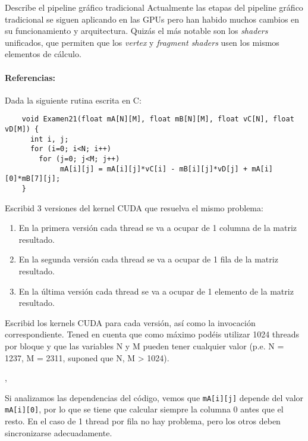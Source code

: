 \begin{pregunta}{Describe el pipeline gráfico tradicional}
Actualmente las etapas del pipeline gráfico tradicional se siguen aplicando en
las GPUs pero han habido muchos cambios en su funcionamiento y arquitectura.
Quizás el más notable son los \emph{shaders} unificados, que permiten que
los \emph{vertex} y \emph{fragment shaders} usen los mismos elementos de
cálculo.

\paragraph{Referencias:}
\cite{lawrence_3d_2012}
\cite{rmit_-_cs_lecture_2017}
\cite{moller_real-time_2018}
\cite{giesen_trip_2011}

\end{pregunta}

\begin{pregunta}{Dada la siguiente rutina escrita en C:}
    \begin{verbatim}
    void Examen21(float mA[N][M], float mB[N][M], float vC[N], float vD[M]) {
      int i, j;
      for (i=0; i<N; i++)
        for (j=0; j<M; j++)
             mA[i][j] = mA[i][j]*vC[i] - mB[i][j]*vD[j] + mA[i][0]*mB[7][j];
    }
    \end{verbatim}

    Escribid 3 versiones del kernel CUDA que resuelva el mismo problema:

\begin{enumerate}[label=(\alph*)]
    \item En la primera versión cada thread se va a ocupar de 1 columna de la matriz resultado.
    \item En la segunda versión cada thread se va a ocupar de 1 fila de la matriz resultado.
    \item En la última versión cada thread se va a ocupar de 1 elemento de la matriz resultado.
\end{enumerate}

Escribid los kernels CUDA para cada versión, así como la invocación
correspondiente. Tened en cuenta que como máximo podéis utilizar 1024 threads
por bloque y que las variables N y M pueden tener cualquier valor (p.e. N =
1237, M = 2311, suponed que N, M > 1024).

\vspace{1em} \sep{}

Si analizamos las dependencias del código, vemos que \texttt{mA[i][j]} depende
del valor \texttt{mA[i][0]}, por lo que se tiene que calcular siempre la columna
0 antes que el resto. En el caso de 1 thread por fila no hay problema, pero los
otros deben sincronizarse adecuadamente.


\end{pregunta}
